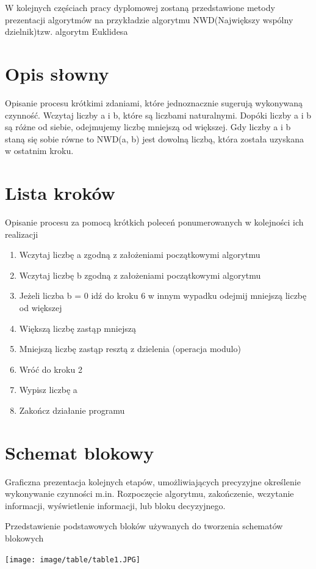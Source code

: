 \documentclass[eng, pl, oneside, openright, final, openbib]{mgr}\DeclareUnicodeCharacter{0301}{\'{e}}
\begin{document}
W kolejnych częściach pracy dyplomowej zostaną przedstawione metody prezentacji algorytmów na  przykładzie algorytmu NWD(Największy wspólny dzielnik)tzw. algorytm Euklidesa

\section{Opis słowny}

Opisanie procesu krótkimi zdaniami, które jednoznacznie sugerują wykonywaną czynność.
\newline
Wczytaj liczby a i b, które są liczbami naturalnymi. Dopóki liczby a i b są różne od siebie, odejmujemy 	liczbę mniejszą od większej. Gdy liczby a i b staną się sobie równe to NWD(a, b) jest dowolną liczbą, 	która została uzyskana w ostatnim kroku.

\section{Lista kroków}

Opisanie procesu za pomocą krótkich poleceń ponumerowanych w kolejności ich realizacji
\begin{enumerate}
	\item Wczytaj liczbę a zgodną z założeniami początkowymi algorytmu
	\item Wczytaj liczbę b zgodną z założeniami początkowymi algorytmu
	\item Jeżeli liczba b = 0 idź do kroku 6 w innym wypadku odejmij mniejszą liczbę 	od większej
	\item Większą liczbę zastąp mniejszą
	\item Mniejszą liczbę zastąp resztą z dzielenia (operacja modulo)
	\item Wróć do kroku 2
	\item Wypisz liczbę a
	\item Zakończ działanie programu
\end{enumerate}
\newpage
\section{Schemat blokowy}
Graficzna prezentacja kolejnych etapów, umożliwiających precyzyjne określenie 
wykonywanie czynności m.in. Rozpoczęcie algorytmu, zakończenie, wczytanie informacji, wyświetlenie informacji, lub bloku decyzyjnego.

\centering \begin{table} [ht]
 \caption{Przedstawienie podstawowych bloków używanych do tworzenia schematów blokowych}
 \texttt{[image: image/table/table1.JPG]}
\end{table}  
\end{document}
